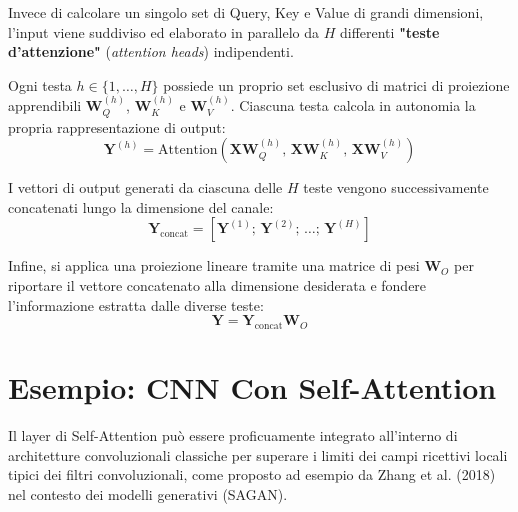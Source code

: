 ﻿\documentclass[11pt, a4paper]{article}
\begin{document}

Invece di calcolare un singolo set di Query, Key e Value di grandi dimensioni, l'input viene suddiviso ed elaborato in parallelo da $H$ differenti \textbf{"teste d'attenzione"} (\emph{attention heads}) indipendenti.

Ogni testa $h \in \{1, \dots, H\}$ possiede un proprio set esclusivo di matrici di proiezione apprendibili $\bm{W}_Q^{(h)}$, $\bm{W}_K^{(h)}$ e $\bm{W}_V^{(h)}$. Ciascuna testa calcola in autonomia la propria rappresentazione di output:
\[ \bm{Y}^{(h)} = \text{Attention}\left(\bm{X}\bm{W}_Q^{(h)}, \, \bm{X}\bm{W}_K^{(h)}, \, \bm{X}\bm{W}_V^{(h)}\right) \]

I vettori di output generati da ciascuna delle $H$ teste vengono successivamente concatenati lungo la dimensione del canale:
\[ \bm{Y}_{\text{concat}} = \left[ \bm{Y}^{(1)} ; \, \bm{Y}^{(2)} ; \, \dots ; \, \bm{Y}^{(H)} \right] \]

Infine, si applica una proiezione lineare tramite una matrice di pesi $\bm{W}_O$ per riportare il vettore concatenato alla dimensione desiderata e fondere l'informazione estratta dalle diverse teste:
\[ \bm{Y} = \bm{Y}_{\text{concat}} \bm{W}_O \]

\newpage

\section{Esempio: CNN Con Self-Attention}

Il layer di Self-Attention può essere proficuamente integrato all'interno di architetture convoluzionali classiche per superare i limiti dei campi ricettivi locali tipici dei filtri convoluzionali, come proposto ad esempio da Zhang et al. (2018) nel contesto dei modelli generativi (SAGAN).

\end{document}
